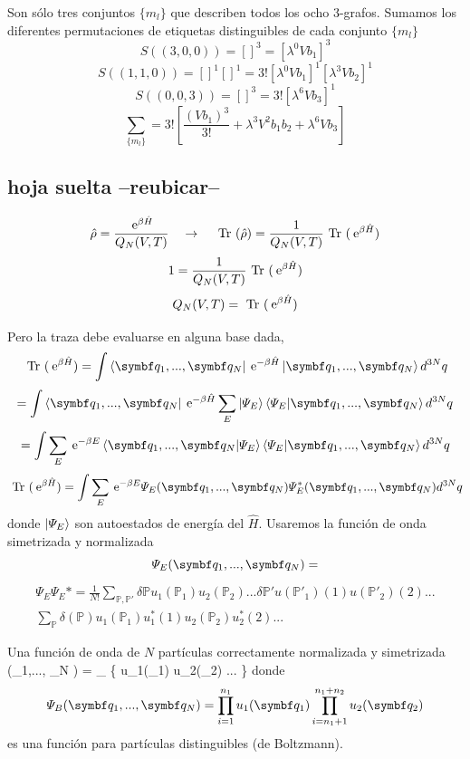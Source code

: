 \documentclass[10pt,oneside]{CBFT_book}
\begin{document}
Son sólo tres conjuntos $\{ m_l \}$ que describen todos los ocho 3-grafos. Sumamos los diferentes permutaciones de 
etiquetas distinguibles de cada conjunto $\{ m_l \}$
\[
	S((3,0,0)) = [  ]^3 = [\lambda^0 V b_1 ]^3
\]
\[
	S((1,1,0)) = []^1[]^1 = 3! [\lambda^0 V b_1 ]^1 [\lambda^3 V b_2 ]^1
\]
\[
	S((0,0,3)) = []^3 = 3! [\lambda^6 V b_3 ]^1
\]
\[
	\sum_{ \{ m_l \} } = 3! \left[ \frac{(V b_1)^3}{3!} + \lambda^3 V^2 b_1 b_2 + \lambda^6 V b_3 \right]
\]

\subsection{hoja suelta --reubicar--}
\[
	\hat{\rho} = \frac{\:\mathrm{e}^{\beta \hat{H}}}{Q_N(V,T)} \quad \rightarrow \quad 
	\text{ Tr }(\hat{\rho}) = \frac{1}{Q_N(V,T)} \text{ Tr }(\:\mathrm{e}^{\beta \hat{H}})
\]
\[
	1 =  \frac{1}{Q_N(V,T)} \text{ Tr }(\:\mathrm{e}^{\beta \hat{H}})
\]
\[
	Q_N(V,T) = \text{ Tr }(\:\mathrm{e}^{\beta \hat{H}})
\]

Pero la traza debe evaluarse en alguna base dada,
\[
	\text{ Tr }(\euler^{\beta \hat{H}}) = 
	\int \Bra{\vb{q}_1,..., \vb{q}_N} \euler^{-\beta \hat{H}} \Ket{\vb{q}_1,..., \vb{q}_N} d^{3N}q
\]
\[
	= \int \Bra{\vb{q}_1,..., \vb{q}_N} \euler^{-\beta \hat{H}} 
	\sum_E \Ket{\Psi_E} \braket{\Psi_E | \vb{q}_1,..., \vb{q}_N} d^{3N}q
\]
\[
	= \int  \sum_E \euler^{ -\beta E }  \braket{\vb{q}_1,..., \vb{q}_N | \Psi_E} 
	\braket{\Psi_E | \vb{q}_1,..., \vb{q}_N} d^{3N}q
\]
\[
	\text{ Tr }(\euler^{\beta \hat{H}}) = 
	\int \sum_E \euler^{ -\beta E }  \Psi_E (\vb{q}_1,..., \vb{q}_N ) 
	\Psi_E^*(\vb{q}_1,..., \vb{q}_N ) d^{3N}q
\]
donde $\Ket{\Psi_E}$ son autoestados de energía del $\hat{H}$. Usaremos la función de onda simetrizada y normalizada
\[
	\Psi_E (\vb{q}_1,..., \vb{q}_N )  =
\]
\begin{multline*}
	\Psi_E \Psi_E* = \frac{1}{N!} \sum_{\mathbb{P},\mathbb{P}'} \delta \mathbb{P} u_1(\mathbb{P}_1)
	u_2(\mathbb{P}_2) ... \delta \mathbb{P}' u(\mathbb{P}'_1)(1) u(\mathbb{P}'_2) (2) ... \\
	\sum_{\mathbb{P}} \delta(\mathbb{P}) u_1(\mathbb{P}_1) u_1^*(1) u_2(\mathbb{P}_2) u_2^*(2) ...
\end{multline*}


Una función de onda de $N$ partículas correctamente normalizada y simetrizada
\be
	\Psi (_1,..., _N ) =  \sum_{  } \delta {} \; 
	\{ u_1(_1) u_2(_2) ... \}
	\label{fun_onda_norm}
\ee
{}
donde 
\[
	\Psi_B (\vb{q}_1,..., \vb{q}_N ) = \prod_{i=1}^{n_1} u_1(\vb{q}_1) \prod_{i=n_1+1}^{n_1+n_2} u_2(\vb{q}_2)
\]
es una función para partículas distinguibles (de Boltzmann).
\end{document}
